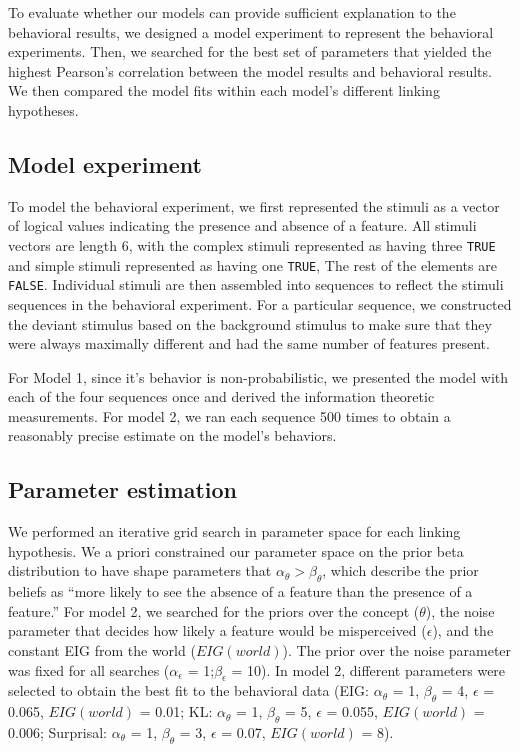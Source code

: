 \documentclass[10pt, letterpaper]{article}
\begin{document}
To evaluate whether our models can provide sufficient explanation to the
behavioral results, we designed a model experiment to represent the
behavioral experiments. Then, we searched for the best set of parameters
that yielded the highest Pearson's correlation between the model results
and behavioral results. We then compared the model fits within each
model's different linking hypotheses.

\hypertarget{model-experiment}{%
\subsection{Model experiment}\label{model-experiment}}

To model the behavioral experiment, we first represented the stimuli as
a vector of logical values indicating the presence and absence of a
feature. All stimuli vectors are length 6, with the complex stimuli
represented as having three \texttt{TRUE} and simple stimuli represented
as having one \texttt{TRUE}, The rest of the elements are
\texttt{FALSE}. Individual stimuli are then assembled into sequences to
reflect the stimuli sequences in the behavioral experiment. For a
particular sequence, we constructed the deviant stimulus based on the
background stimulus to make sure that they were always maximally
different and had the same number of features present.

For Model 1, since it's behavior is non-probabilistic, we presented the
model with each of the four sequences once and derived the information
theoretic measurements. For model 2, we ran each sequence 500 times to
obtain a reasonably precise estimate on the model's behaviors.

\hypertarget{parameter-estimation}{%
\subsection{Parameter estimation}\label{parameter-estimation}}

We performed an iterative grid search in parameter space for each
linking hypothesis. We a priori constrained our parameter space on the
prior beta distribution to have shape parameters that
\(\alpha_{\theta} > \beta_{\theta}\), which describe the prior beliefs
as ``more likely to see the absence of a feature than the presence of a
feature.'' For model 2, we searched for the priors over the concept
(\(\theta\)), the noise parameter that decides how likely a feature
would be misperceived (\(\epsilon\)), and the constant EIG from the
world (\(EIG(world)\)). The prior over the noise parameter was fixed for
all searches (\(\alpha_{\epsilon}\) = 1;\(\beta_{\epsilon}\) = 10). In
model 2, different parameters were selected to obtain the best fit to
the behavioral data (EIG: \(\alpha_{\theta}\) = 1, \(\beta_{\theta}\) =
4, \(\epsilon\) = 0.065, \(EIG(world)\) = 0.01; KL: \(\alpha_{\theta}\)
= 1, \(\beta_{\theta}\) = 5, \(\epsilon\) = 0.055, \(EIG(world)\) =
0.006; Surprisal: \(\alpha_{\theta}\) = 1, \(\beta_{\theta}\) = 3,
\(\epsilon\) = 0.07, \(EIG(world)\) = 8).
\end{document}
